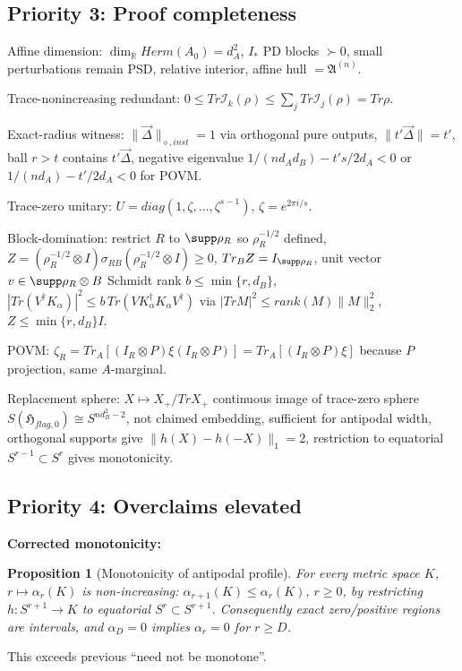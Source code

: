 \documentclass[11pt,a4paper]{article}
\newtheorem{proposition}[theorem]{Proposition}
\begin{document}
\subsection{Priority 3: Proof completeness}

Affine dimension: $\dim_{\mathbb R}Herm(A_0)=d_A^2$, $I_*$ PD blocks $\succ0$, small perturbations remain PSD, relative interior, affine hull $=\mathfrak A^{(n)}$.

Trace-nonincreasing redundant: $0\le Tr\mathcal I_k(\rho)\le\sum_jTr\mathcal I_j(\rho)=Tr\rho$.

Exact-radius witness: $\|\vec\Delta\|_{\diamond,inst}=1$ via orthogonal pure outputs, $\|t'\vec\Delta\|=t'$, ball $r>t$ contains $t'\vec\Delta$, negative eigenvalue $1/(nd_Ad_B)-t's/2d_A<0$ or $1/(nd_A)-t'/2d_A<0$ for POVM.

Trace-zero unitary: $U=diag(1,\zeta,\dots,\zeta^{s-1})$, $\zeta=e^{2\pi i/s}$.

Block-domination: restrict $R$ to $\supp\rho_R$ so $\rho_R^{-1/2}$ defined, $Z=(\rho_R^{-1/2}\otimes I)\sigma_{RB}(\rho_R^{-1/2}\otimes I)\ge0$, $Tr_BZ=I_{\supp\rho_R}$, unit vector $v\in\supp\rho_R\otimes B$ Schmidt rank $b\le\min\{r,d_B\}$, $|Tr(V^\dagger K_\alpha)|^2\le b\,Tr(VK_\alpha^\dagger K_\alpha V^\dagger)$ via $|Tr M|^2\le rank(M)\|M\|_2^2$, $Z\le\min\{r,d_B\}I$.

POVM: $\zeta_R=Tr_A[(I_R\otimes P)\xi(I_R\otimes P)]=Tr_A[(I_R\otimes P)\xi]$ because $P$ projection, same $A$-marginal.

Replacement sphere: $X\mapsto X_+/Tr X_+$ continuous image of trace-zero sphere $S(\mathfrak H_{flag,0})\cong S^{nd_B^2-2}$, not claimed embedding, sufficient for antipodal width, orthogonal supports give $\|h(X)-h(-X)\|_1=2$, restriction to equatorial $S^{r-1}\subset S^r$ gives monotonicity.

\subsection{Priority 4: Overclaims elevated}

\textbf{Corrected monotonicity:}
\begin{proposition}[Monotonicity of antipodal profile]
For every metric space $K$, $r\mapsto\alpha_r(K)$ is non-increasing: $\alpha_{r+1}(K)\le\alpha_r(K)$, $r\ge0$, by restricting $h:S^{r+1}\to K$ to equatorial $S^r\subset S^{r+1}$. Consequently exact zero/positive regions are intervals, and $\alpha_D=0$ implies $\alpha_r=0$ for $r\ge D$.
\end{proposition}
This exceeds previous ``need not be monotone''.
\end{document}
